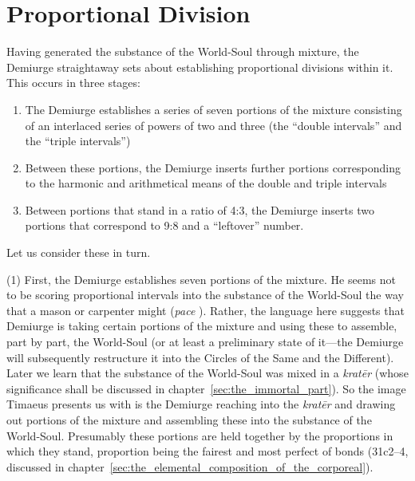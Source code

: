 
\section{Proportional Division} %
\label{sec:proportional_division}

Having generated the substance of the World-Soul through mixture, the Demiurge straightaway sets about establishing proportional divisions within it. This occurs in three stages:
\begin{enumerate}[(1)]
	\item The Demiurge establishes a series of seven portions of the mixture consisting of an interlaced series of powers of two and three (the ``double intervals'' and the ``triple intervals'')
	\item Between these portions, the Demiurge inserts further portions corresponding to the harmonic and arithmetical means of the double and triple intervals
	\item Between portions that stand in a ratio of 4:3, the Demiurge inserts two portions that correspond to 9:8 and a ``leftover'' number.
\end{enumerate}
Let us consider these in turn.

(1) First, the Demiurge establishes seven portions of the mixture. He seems not to be scoring proportional intervals into the substance of the World-Soul the way that a mason or carpenter might (\emph{pace} \citealt{Robinson:1970lq}). Rather, the language here suggests that Demiurge is taking certain portions of the mixture and using these to assemble, part by part, the World-Soul (or at least a preliminary state of it---the Demiurge will subsequently restructure it into the Circles of the Same and the Different). Later we learn that the substance of the World-Soul was mixed in a \emph{kratēr} (whose significance shall be discussed in chapter~\ref{sec:the_immortal_part}). So the image Timaeus presents us with is the Demiurge reaching into the \emph{kratēr} and drawing out portions of the mixture and assembling these into the substance of the World-Soul. Presumably these portions are held together by the proportions in which they stand, proportion being the fairest and most perfect of bonds (31c2–4, discussed in chapter~\ref{sec:the_elemental_composition_of_the_corporeal}).

